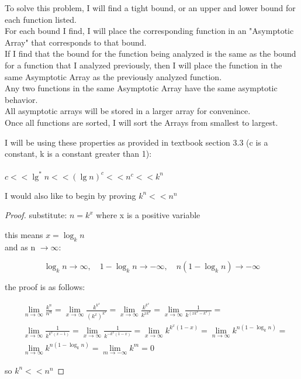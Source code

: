 \documentclass[11pt,fleqn]{article}
\theoremstyle{definition}
\theoremstyle{remark}
\begin{document}
To solve this problem, I will find a tight bound, or an 
upper and lower bound for each function listed.\\

For each bound I find, I will place the corresponding function
in an "Asymptotic Array" that corresponds to that bound.\\

If I find that the bound for the function being analyzed
is the same as the bound for a function
that I analyzed previously, then I will 
place the function in the same Asymptotic Array 
as the previously analyzed function.\\

Any two functions in the same Asymptotic Array have the same 
asymptotic behavior.\\

All asymptotic arrays will be stored in a larger array for convenince.\\

Once all functions are sorted, I will sort the Arrays from smallest
to largest.

I will be using these properties as provided in textbook section 3.3
(c is a constant, k is a constant greater than 1):\\\\
$c << \lg^*n << ({\lg n})^c << n^{c} << k^{n}$

I would also like to begin by proving $k^{n} << n^{n}$

\begin{proof}
    substitute: $n = k^x$ where x is a positive variable

    this means $x = \log_k n$ \\

    and as n $\to \infty$: 
    
    \noindent \[
    \log_k n \to \infty,  
    \quad 1 - \log_k n \to -\infty, 
    \quad n(1 - \log_k n) \to -\infty
    \]

    the proof is as follows:

    \begin{align*}
        &\lim_{n \to \infty} \frac{k^{n}}{n^{n}} = 
        \lim_{x \to \infty} \frac{k^{k^{x}}}{{(k^x)}^{k^{x}}} = 
        \lim_{x \to \infty} \frac{k^{k^{x}}}{k^{x{k^{x}}}} = 
        \lim_{x \to \infty} \frac{1}{k^{({x{k^{x}}} - {k^x})}} = \\
        &\lim_{x \to \infty} \frac{1}{k^{{k^{x}({x} - 1)}}} = 
        \lim_{x \to \infty} \frac{1}{k^{{-k^{x}(1 - {x})}}} = 
        \lim_{x \to \infty} {k^{{k^{x}(1 - {x})}}} = 
        \lim_{n \to \infty} {k^{{n(1 - \log_k n)}}} = \\
        &\lim_{n \to \infty} {k^{{n(1 - \log_k n)}}} = 
        \lim_{m \to -\infty} {k^{m}} = 0
    \end{align*} 

    so $k^n << n^n$
\end{proof}
\end{document}
